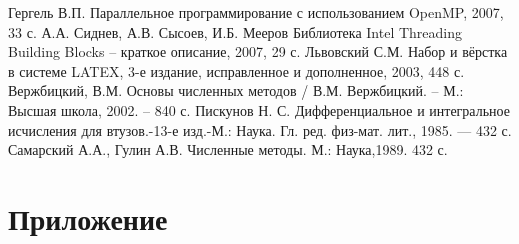 \documentclass{report}
\begin{document}
\begin{thebibliography}{1}
 Гергель В.П. Параллельное программирование с использованием
OpenMP, 2007, 33 с. 
 А.А. Сиднев, А.В. Сысоев, И.Б. Мееров Библиотека Intel Threading Building Blocks – краткое описание, 2007, 29 с. 
 Львовский С.М. Набор и вёрстка в системе LATEX, 3-е издание, исправленное и дополненное, 2003, 448 с. 
 Вержбицкий, В.М. Основы численных методов / В.М. Вержбицкий. – М.:
Высшая школа, 2002. – 840 с.
 Пискунов Н. С. Дифференциальное и интегральное исчисления для
втузов.-13-е изд.-М.: Наука. Гл. ред. физ-мат. лит., 1985. — 432 с.
 Самарский А.А., Гулин А.В. Численные методы. М.: Наука,1989. 432 с.
\end{thebibliography}
\newpage

\section*{Приложение}
\end{document}
